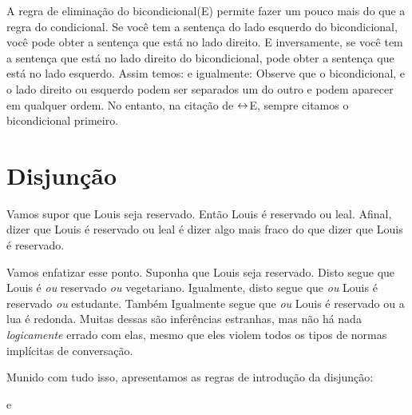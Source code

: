 A regra de elimina\c c\~ao do bicondicional({\eiff}E) permite fazer um pouco mais do que a regra do condicional.  Se voc\^e tem a senten\c ca do lado esquerdo do bicondicional, voc\^e pode obter a senten\c ca que est\'a no lado direito. E inversamente, se voc\^e tem a senten\c ca que est\'a no lado direito do bicondicional, pode obter a senten\c ca que est\'a no lado esquerdo. Assim temos:
e igualmente:
Observe que o bicondicional, e o lado  direito ou esquerdo podem ser separados um  do outro e podem aparecer em qualquer ordem. No entanto, na cita\c c\~ao de $\leftrightarrow$E, sempre citamos o  bicondicional primeiro.


\section{Disjun\c c\~ao}
Vamos supor que Louis seja reservado.  Ent\~ao Louis \'e reservado ou leal. Afinal, dizer que Louis \'e reservado ou leal \'e dizer algo mais fraco do que dizer que Louis \'e reservado. 

Vamos enfatizar esse ponto. Suponha que Louis seja reservado. Disto segue que  Louis \'e \emph{ou} reservado \emph{ou} vegetariano.  Igualmente,  disto segue que \emph{ou} Louis   \'e reservado \emph{ou} estudante. Tamb\'em   Igualmente segue que   \emph{ou} Louis \'e reservado ou a lua \'e redonda. Muitas dessas s\~ao infer\^encias estranhas, mas n\~ao h\'a nada \emph{logicamente} errado com elas, mesmo que eles violem todos os tipos de normas impl\'icitas de conversa\c c\~ao.

Munido com tudo isso, apresentamos as regras de introdu\c c\~ao da disjun\c c\~ao:

e


